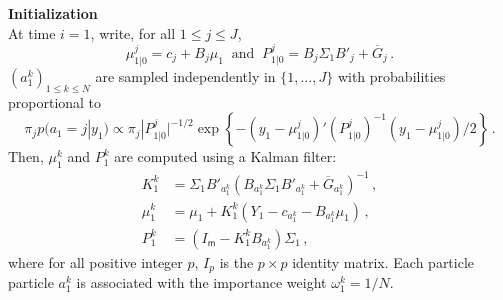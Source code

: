\documentclass[nolayout]{article}
\theoremstyle{plain}
\theoremstyle{definition}
\newcommand{\1}{\mathbbm{1}}
\def\dimz{\mathsf{m}}
\def\barG{\overline{G}}
\def\eqsp{\,}
\begin{document}
\vspace{.2cm}

\noindent\textbf{Initialization}\\
At time $i=1$, write, for all $1\le j \le J$,
\[
\mu^j_{1|0} = c_{j}+B_{j}\mu_1\;\;\mbox{and}\;\;P_{1|0}^j =B_{j}\Sigma_1B'_{j} + \barG_{j}\eqsp.
\]
$(a^k_1)_{1\le k \le N}$ are sampled independently in $\{1,\ldots,J\}$ with probabilities proportional to
\[
\pi_j p(a_1=j|y_1) \propto \pi_j |P_{1|0}^j|^{-1/2}\exp\left\{-(y_1-\mu^j_{1|0})'(P_{1|0}^j)^{-1}(y_1-\mu^j_{1|0})/2\right\}\eqsp.
\]
Then, $\mu_1^k$ and $P_1^k$ are computed using a Kalman filter:
\begin{align*}
K^k_{1} &=\Sigma_1B'_{a_1^k}\left(B_{a_1^k}\Sigma_1B'_{a_1^k} + \barG_{a_1^k}\right)^{-1}\eqsp,\\
\mu^k_{1} &= \mu_{1} + K^k_1\left(Y_1 - c_{a_{1}^k} - B_{a_1^k}\mu_{1}\right)\eqsp,\\
P^k_{1} &=\left(I_{\dimz}-K^k_{1}B_{a_1^k}\right)\Sigma_1\eqsp,
\end{align*}
where for all positive integer $p$, $I_p$ is the $p\times p$ identity matrix. Each particle particle $a_1^k$ is associated with the importance weight $\omega^k_1 = 1/N$.

\vspace{.2cm}
\end{document}
